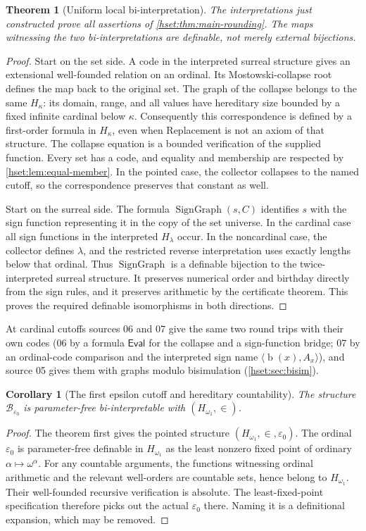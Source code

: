 \documentclass[11pt,letterpaper]{article}
\newtheorem{theorem}{Theorem}[section]
\newtheorem{corollary}[corollary]{Corollary}\aliascntresetthe{corollary}
\theoremstyle{definition}
\theoremstyle{remark}
\newcommand{\bd}{\operatorname{b}}
\newcommand{\B}{\mathcal B}
\newcommand{\SG}{\operatorname{SignGraph}}
\begin{document}
\begin{theorem}[Uniform local bi-interpretation]
\label{hset:thm:biinterpretation}
The interpretations just constructed prove all assertions of
\cref{hset:thm:main-rounding}. The maps witnessing the two bi-interpretations
are definable, not merely external bijections.
\end{theorem}
\begin{proof}
Start on the set side. A code in the interpreted surreal structure gives
an extensional well-founded relation on an ordinal. Its Mostowski-collapse
root defines the map back to the original set. The graph of the collapse
belongs to the same $H_\kappa$: its domain, range, and all values have
hereditary size bounded by a fixed infinite cardinal below $\kappa$.
Consequently this correspondence is defined by a first-order formula in
$H_\kappa$, even when Replacement is not an axiom of that structure.
The collapse equation is a bounded verification of the supplied function.
Every set has a code, and equality and membership are respected by
\cref{hset:lem:equal-member}. In the pointed case, the collector collapses to
the named cutoff, so the correspondence preserves that constant as well.

Start on the surreal side. The formula $\SG(s,C)$ identifies $s$ with the
sign function representing it in the copy of the set universe. In the
cardinal case all sign functions in the interpreted $H_\lambda$ occur.
In the noncardinal case, the collector defines $\lambda$, and the restricted
reverse interpretation uses exactly lengths below that ordinal. Thus $\SG$
is a definable bijection to the twice-interpreted surreal structure.
It preserves numerical order and birthday directly from the sign rules,
and it preserves arithmetic by the certificate theorem. This proves the
required definable isomorphisms in both directions.
\end{proof}

At cardinal cutoffs sources 06 and 07 give the same two round trips with
their own codes (06 by a formula $\mathsf{Eval}$ for the collapse and a
sign-function bridge; 07 by an ordinal-code comparison and the interpreted sign
name $\langle\bd(x),A_x\rangle$), and source 05 gives them with graphs modulo
bisimulation (\cref{hset:sec:bisim}).

\begin{corollary}[The first epsilon cutoff and hereditary countability]
\label{hset:cor:epsilon0}
The structure $\B_{\varepsilon_0}$ is parameter-free bi-interpretable with
$(H_{\omega_1},\in)$.
\end{corollary}
\begin{proof}
The theorem first gives the pointed structure
$(H_{\omega_1},\in,\varepsilon_0)$. The ordinal $\varepsilon_0$ is
parameter-free definable in $H_{\omega_1}$ as the least nonzero fixed point
of ordinary $\alpha\mapsto\omega^\alpha$. For any countable
arguments, the functions witnessing ordinal arithmetic and the relevant
well-orders are countable sets, hence belong to $H_{\omega_1}$. Their
well-founded recursive verification is absolute. The least-fixed-point
specification therefore picks out the actual $\varepsilon_0$ there.
Naming it is a definitional expansion, which may be removed.
\end{proof}
\end{document}
